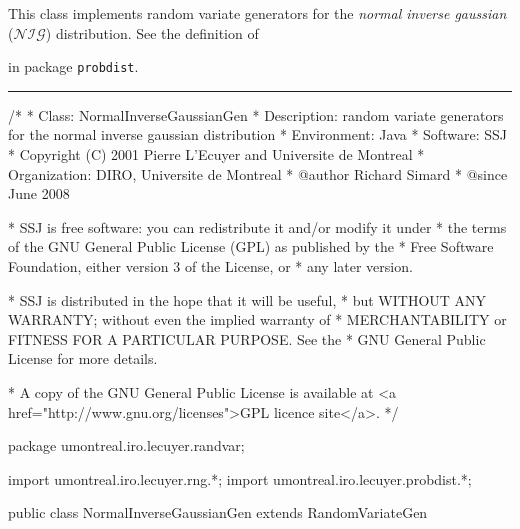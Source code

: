 
\newcommand{\nig}{\emph{normal inverse gaussian}}

This class implements random variate generators for 
the \nig{} ($\mathcal{NIG}$) distribution. See the definition of
\begin{latexonly}%
in package \texttt{probdist}.
\end{latexonly}


\bigskip\hrule\bigskip

\begin{code}
\begin{hide}
/*
 * Class:        NormalInverseGaussianGen
 * Description:  random variate generators for the normal inverse gaussian distribution
 * Environment:  Java
 * Software:     SSJ 
 * Copyright (C) 2001  Pierre L'Ecuyer and Universite de Montreal
 * Organization: DIRO, Universite de Montreal
 * @author       Richard Simard
 * @since        June 2008

 * SSJ is free software: you can redistribute it and/or modify it under
 * the terms of the GNU General Public License (GPL) as published by the
 * Free Software Foundation, either version 3 of the License, or
 * any later version.

 * SSJ is distributed in the hope that it will be useful,
 * but WITHOUT ANY WARRANTY; without even the implied warranty of
 * MERCHANTABILITY or FITNESS FOR A PARTICULAR PURPOSE.  See the
 * GNU General Public License for more details.

 * A copy of the GNU General Public License is available at
   <a href="http://www.gnu.org/licenses">GPL licence site</a>.
 */
\end{hide}
package umontreal.iro.lecuyer.randvar;\begin{hide}
import umontreal.iro.lecuyer.rng.*;
import umontreal.iro.lecuyer.probdist.*;
\end{hide}

public class NormalInverseGaussianGen extends RandomVariateGen \begin{hide} {
   protected double mu;
   protected double delta = -1.0;
   protected double alpha = -1.0;
   protected double beta = -2.0;
   protected double gamma = -1.0;
\end{hide}
\end{code}

